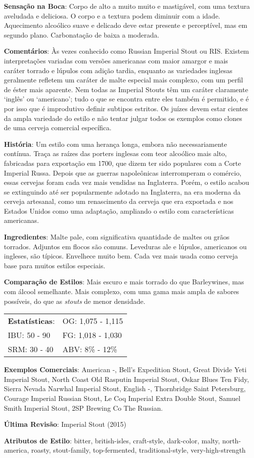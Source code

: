 \textbf{Sensação na Boca}: Corpo de alto a muito muito e mastigável, com uma textura aveludada e deliciosa. O corpo e a textura podem diminuir com a idade. Aquecimento alcoólico suave e delicado deve estar presente e perceptível, mas em segundo plano. Carbonatação de baixa a moderada.

\textbf{Comentários}: Às vezes conhecido como Russian Imperial Stout ou RIS. Existem interpretações variadas com versões americanas com maior amargor e mais caráter torrado e lúpulos com adição tardia, enquanto as variedades inglesas geralmente refletem um caráter de malte especial mais complexo, com um perfil de éster mais aparente. Nem todas as Imperial Stouts têm um caráter claramente ‘inglês’ ou ‘americano’; tudo o que se encontra entre eles também é permitido, e é por isso que é improdutivo definir subtipos estritos. Os juízes devem estar cientes da ampla variedade do estilo e não tentar julgar todos os exemplos como clones de uma cerveja comercial específica.

\textbf{História}: Um estilo com uma herança longa, embora não necessariamente contínua. Traça as raízes das porters inglesas com teor alcoólico mais alto, fabricadas para exportação em 1700, que dizem ter sido populares com a Corte Imperial Russa. Depois que as guerras napoleônicas interromperam o comércio, essas cervejas foram cada vez mais vendidas na Inglaterra. Porém, o estilo acabou se extinguindo até ser popularmente adotado na Inglaterra, na era moderna da cerveja artesanal, como um renascimento da cerveja que era exportada e nos Estados Unidos como uma adaptação, ampliando o estilo com características americanas.

\textbf{Ingredientes}: Malte pale, com significativa quantidade de maltes ou grãos torrados. Adjuntos em flocos são comuns. Leveduras ale e lúpulos, americanos ou ingleses, são típicos. Envelhece muito bem. Cada vez mais usada como cerveja base para muitos estilos especiais.

\textbf{Comparação de Estilos}: Mais escuro e mais torrado do que Barleywines, mas com álcool semelhante. Mais complexo, com uma gama mais ampla de sabores possíveis, do que as \textit{stouts} de menor densidade.

\begin{tabular}{@{}p{35mm}p{35mm}@{}}
  \textbf{Estatísticas}: & OG: 1,075 - 1,115 \\
  IBU: 50 - 90  & FG: 1,018 - 1,030 \\
  SRM: 30 - 40  & ABV: 8\% - 12\%
\end{tabular}

\textbf{Exemplos Comerciais}: American -, Bell's Expedition Stout, Great Divide Yeti Imperial Stout, North Coast Old Rasputin Imperial Stout, Oskar Blues Ten Fidy, Sierra Nevada Narwhal Imperial Stout, English -, Thornbridge Saint Petersburg, Courage Imperial Russian Stout, Le Coq Imperial Extra Double Stout, Samuel Smith Imperial Stout, 2SP Brewing Co The Russian.

\textbf{Última Revisão}: Imperial Stout (2015)

\textbf{Atributos de Estilo}: bitter, british-isles, craft-style, dark-color, malty, north-america, roasty, stout-family, top-fermented, traditional-style, very-high-strength
